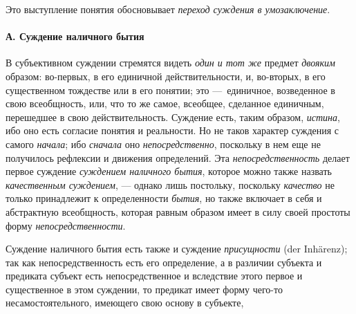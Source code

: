 \documentclass[twoside]{article}
\begin{document}
{{{{Это выступление понятия обосновывает
{\em переход суждения в
умозаключение}.

\paragraph[А. Суждение наличного бытия]{А. Суждение наличного бытия}
В субъективном суждении стремятся видеть
{\em один и тот же}
предмет {\em двояким}
образом: во-первых, в его единичной действительности, и,
во-вторых, в его существенном тождестве или в его понятии; это
—~единичное, возведенное в свою всеобщность, или, что то же
самое, всеобщее, сделанное единичным, перешедшее в свою действительность.
Суждение есть, таким образом,
{\em истина}, ибо оно
есть согласие понятия и реальности. Но не таков характер суждения с самого
{\em начала}; ибо
{\em сначала} оно
{\em непосредственно},
поскольку в нем еще не получилось рефлексии и движения
определений. Эта
{\em непосредственность}
делает первое суждение
{\em суждением наличного бытия},
которое можно также назвать
{\em качественным суждением}, —
однако лишь постольку, поскольку
{\em качество} не только
принадлежит к определенности
{\em бытия}, но также
включает в себя и абстрактную всеобщность, которая равным образом имеет в
силу своей простоты форму
{\em непосредственности}.

Суждение наличного бытия есть также и суждение
{\em присущности} (der Inhärenz);
так как непосредственность есть его определение, а в различии
субъекта и предиката субъект есть непосредственное и
вследствие этого первое и существенное в этом суждении, то
предикат имеет форму чего-то несамостоятельного, имеющего свою основу в
субъекте,

}}}}
\end{document}
